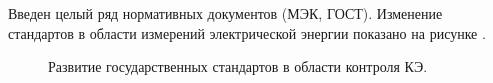 Введен целый ряд нормативных документов (МЭК, ГОСТ). Изменение стандартов в области измерений электрической энергии показано на рисунке \cite{ГОСТ30804.4.30-2013, ГОСТ30804.4.7-2013, ГОСТ32144-2013, ГОСТР8.655-2009, ГОСТР51317.4.15-2012,ГОСТ33073-2014,ГОСТ8.622-2013}. 
 
\begin{figure}[ht]
	\caption{Развитие государственных стандартов в области контроля КЭ.}\label{fig:picture1}
\end{figure}








